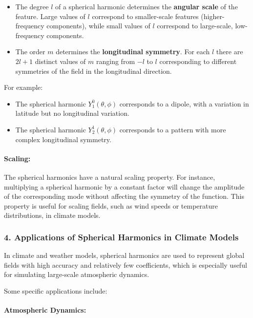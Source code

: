 \begin{itemize}
	\item The degree $l$ of a spherical harmonic determines the \textbf{angular scale} of the feature. Large values of $l$ correspond to smaller-scale features (higher-frequency components), while small values of $l$ correspond to large-scale, low-frequency components.
	\item The order $m$ determines the \textbf{longitudinal symmetry}. For each $l$ there are $2l+1$ distinct values of $m$ ranging from $-l$ to $l$ corresponding to different symmetries of the field in the longitudinal direction.
\end{itemize}
For example:

\begin{itemize}
	\item The spherical harmonic $Y_1^0(\theta,\phi)$ corresponds to a dipole, with a variation in latitude but no longitudinal variation.
	\item The spherical harmonic $Y_2^1(\theta,\phi)$ corresponds to a pattern with more complex longitudinal symmetry.
\end{itemize}

\paragraph{\textbf{Scaling}:}

The spherical harmonics have a natural scaling property. For instance, multiplying a spherical harmonic by a constant factor will change the amplitude of the corresponding mode without affecting the symmetry of the function. This property is useful for scaling fields, such as wind speeds or temperature distributions, in climate models.

\subsubsection{4. \textbf{Applications of Spherical Harmonics in Climate Models}}

In climate and weather models, spherical harmonics are used to represent global fields with high accuracy and relatively few coefficients, which is especially useful for simulating large-scale atmospheric dynamics.

Some specific applications include:

\paragraph{\textbf{Atmospheric Dynamics}:}

